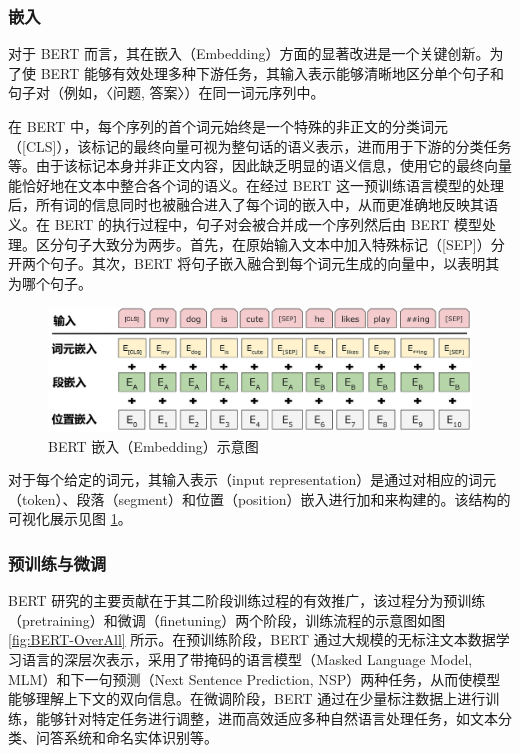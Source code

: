 \subsubsection{嵌入}

对于 BERT 而言，其在嵌入（Embedding）方面的显著改进是一个关键创新。为了使 BERT 能够有效处理多种下游任务，其输入表示能够清晰地区分单个句子和句子对（例如，〈问题, 答案〉）在同一词元序列中。

在 BERT 中，每个序列的首个词元始终是一个特殊的非正文的分类词元（[CLS]），该标记的最终向量可视为整句话的语义表示，进而用于下游的分类任务等。由于该标记本身并非正文内容，因此缺乏明显的语义信息，使用它的最终向量能恰好地在文本中整合各个词的语义。在经过 BERT 这一预训练语言模型的处理后，所有词的信息同时也被融合进入了每个词的嵌入中，从而更准确地反映其语义。在 BERT 的执行过程中，句子对会被合并成一个序列然后由 BERT 模型处理。区分句子大致分为两步。首先，在原始输入文本中加入特殊标记（[SEP]）分开两个句子。其次，BERT 将句子嵌入融合到每个词元生成的向量中，以表明其为哪个句子。

\begin{figure}[htb]
	\centering
	\includegraphics[width=0.9\linewidth]{figures/bert_Input_Embeddings.jpg}
	\caption{BERT 嵌入（Embedding）示意图 \cite{devlin_bert_2019}}
	\label{fig:BERT-embedding}
\end{figure}

对于每个给定的词元，其输入表示（input representation）是通过对相应的词元（token）、段落（segment）和位置（position）嵌入进行加和来构建的。该结构的可视化展示见图 \ref{fig:BERT-embedding}。

\subsubsection{预训练与微调}

BERT 研究的主要贡献在于其二阶段训练过程的有效推广，该过程分为预训练（pretraining）和微调（finetuning）两个阶段，训练流程的示意图如图 \ref{fig:BERT-OverAll} 所示。在预训练阶段，BERT 通过大规模的无标注文本数据学习语言的深层次表示，采用了带掩码的语言模型（Masked Language Model, MLM）和下一句预测（Next Sentence Prediction, NSP）两种任务，从而使模型能够理解上下文的双向信息。在微调阶段，BERT 通过在少量标注数据上进行训练，能够针对特定任务进行调整，进而高效适应多种自然语言处理任务，如文本分类、问答系统和命名实体识别等。

